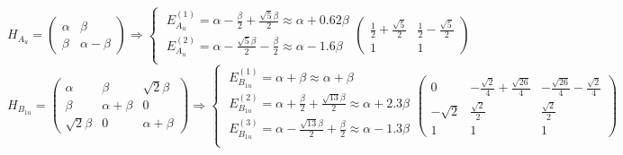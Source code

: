 \documentclass[a4paper,10pt]{article}
\begin{document}
$$
H_{A_{u}} = \begin{pmatrix}\alpha & \beta\\\beta & \alpha - \beta\end{pmatrix}
\Rightarrow\begin{cases}\; E_{A_{u}}^{(1)} = \alpha - \frac{\beta}{2} + \frac{\sqrt{5} \beta}{2} \approx \alpha + 0.62 \beta \\\; E_{A_{u}}^{(2)} = \alpha - \frac{\sqrt{5} \beta}{2} - \frac{\beta}{2} \approx \alpha - 1.6 \beta \\\end{cases}\begin{pmatrix}\frac{1}{2} + \frac{\sqrt{5}}{2} & \frac{1}{2} - \frac{\sqrt{5}}{2}\\1 & 1\end{pmatrix}
$$
$$
H_{B_{1u}} = \begin{pmatrix}\alpha & \beta & \sqrt{2} \beta\\\beta & \alpha + \beta & 0\\\sqrt{2} \beta & 0 & \alpha + \beta\end{pmatrix}
\Rightarrow\begin{cases}\; E_{B_{1u}}^{(1)} = \alpha + \beta \approx \alpha + \beta \\\; E_{B_{1u}}^{(2)} = \alpha + \frac{\beta}{2} + \frac{\sqrt{13} \beta}{2} \approx \alpha + 2.3 \beta \\\; E_{B_{1u}}^{(3)} = \alpha - \frac{\sqrt{13} \beta}{2} + \frac{\beta}{2} \approx \alpha - 1.3 \beta \\\end{cases}\begin{pmatrix}0 & - \frac{\sqrt{2}}{4} + \frac{\sqrt{26}}{4} & - \frac{\sqrt{26}}{4} - \frac{\sqrt{2}}{4}\\- \sqrt{2} & \frac{\sqrt{2}}{2} & \frac{\sqrt{2}}{2}\\1 & 1 & 1\end{pmatrix}
$$
\end{document}
